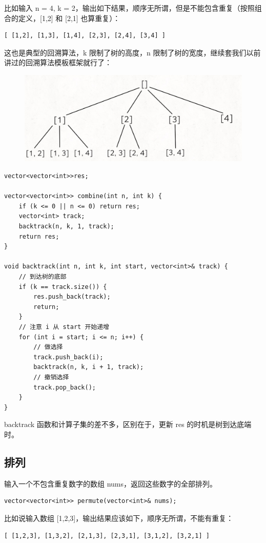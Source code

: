 \documentclass[12pt]{article}
\begin{document}
比如输入 n = 4, k = 2，输出如下结果，顺序无所谓，但是不能包含重复（按照组合的定义，[1,2] 和 [2,1] 也算重复）：
\begin{lstlisting}
[ [1,2], [1,3], [1,4], [2,3], [2,4], [3,4] ]
\end{lstlisting}

这也是典型的回溯算法，k 限制了树的高度，n 限制了树的宽度，继续套我们以前讲过的回溯算法模板框架就行了：
\begin{figure}[H]
    \centering
    \includegraphics[width=.6\textwidth]{fig/Combination.png}
\end{figure}

\begin{lstlisting}
vector<vector<int>>res;

vector<vector<int>> combine(int n, int k) {
    if (k <= 0 || n <= 0) return res;
    vector<int> track;
    backtrack(n, k, 1, track);
    return res;
}

void backtrack(int n, int k, int start, vector<int>& track) {
    // 到达树的底部
    if (k == track.size()) {
        res.push_back(track);
        return;
    }
    // 注意 i 从 start 开始递增
    for (int i = start; i <= n; i++) {
        // 做选择
        track.push_back(i);
        backtrack(n, k, i + 1, track);
        // 撤销选择
        track.pop_back();
    }
}
\end{lstlisting}

backtrack 函数和计算子集的差不多，区别在于，更新 res 的时机是树到达底端时。

\subsection{排列}
输入一个不包含重复数字的数组 nums，返回这些数字的全部排列。
\begin{lstlisting}
vector<vector<int>> permute(vector<int>& nums);
\end{lstlisting}

比如说输入数组 [1,2,3]，输出结果应该如下，顺序无所谓，不能有重复：
\begin{lstlisting}
[ [1,2,3], [1,3,2], [2,1,3], [2,3,1], [3,1,2], [3,2,1] ]
\end{lstlisting}
\end{document}
